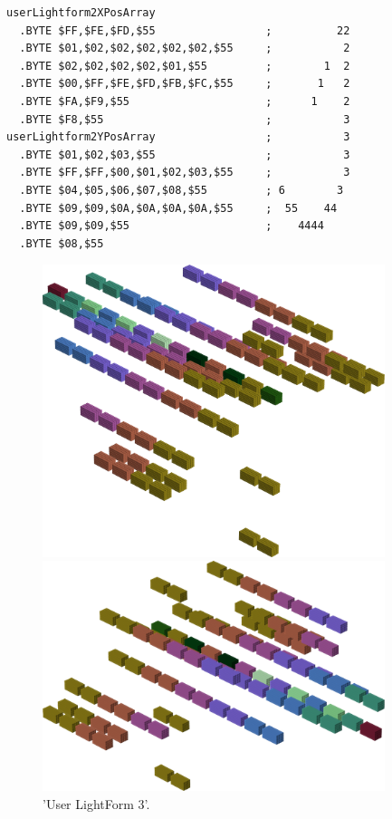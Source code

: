 \begin{minipage}[b]{0.48\linewidth}
\begin{lrbox}{\mybox}%
\begin{lstlisting}[basicstyle=\ttfamily\tiny,escapechar=\%]
userLightform2XPosArray
  .BYTE $FF,$FE,$FD,$55                 ;          22
  .BYTE $01,$02,$02,$02,$02,$02,$55     ;           2
  .BYTE $02,$02,$02,$02,$01,$55         ;        1  2
  .BYTE $00,$FF,$FE,$FD,$FB,$FC,$55     ;       1   2
  .BYTE $FA,$F9,$55                     ;      1    2
  .BYTE $F8,$55                         ;           3
userLightform2YPosArray                 ;           3
  .BYTE $01,$02,$03,$55                 ;           3
  .BYTE $FF,$FF,$00,$01,$02,$03,$55     ;           3
  .BYTE $04,$05,$06,$07,$08,$55         ; 6        3 
  .BYTE $09,$09,$0A,$0A,$0A,$0A,$55     ;  55    44  
  .BYTE $09,$09,$55                     ;    4444    
  .BYTE $08,$55
\end{lstlisting}
\end{lrbox}%
\scalebox{0.8}{\usebox{\mybox}}

\end{minipage}
%
%
\begin{minipage}[b]{0.48\linewidth}
\begin{figure}[H]
    \centering
    \begin{adjustbox}{width=5cm,margin=0cm 0cm}
      \includegraphics[width=10cm]{src/colorspace_patterns/pattern11-45.png}%
    \end{adjustbox}
    \begin{adjustbox}{width=5cm,margin=0cm 0cm}
      \includegraphics[width=10cm]{src/colorspace_patterns/pattern11-225.png}%
    \end{adjustbox}
\caption{'User LightForm 3'.}
\end{figure}
\end{minipage}
